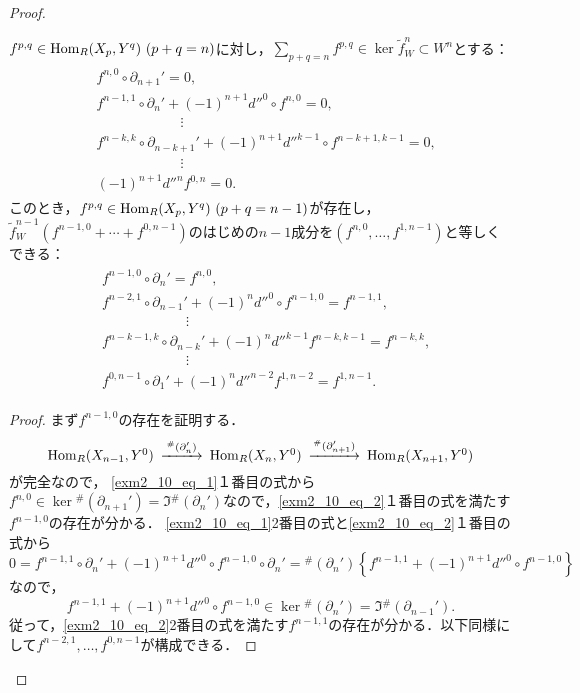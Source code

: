 \begin{proof}
  \begin{lem}\label{lem1.1}
    $f^{p, q} \in \operatorname{Hom}_R(X_p, Y^q)~(p+q=n)$に対し，$\sum_{p+q=n} f^{p, q} \in \ker \tilde{f}_W^n \subset W^n$とする：
    \begin{align}
      \begin{split}
        & f^{n, 0} \circ \partial_{n+1}' = 0, \\
        & f^{n-1, 1} \circ \partial_n' + (-1)^{n+1} d''^0 \circ f^{n, 0} = 0, \\
        & \qquad\qquad\qquad \vdots \\
        & f^{{n-k}, k} \circ \partial_{n-k+1}' + (-1)^{n+1} d''^{k-1} \circ f^{n-k+1, k-1} = 0, \\
        & \qquad\qquad\qquad \vdots \\
        & (-1)^{n+1} d''^n f^{0, n} = 0.
      \end{split}
      \label{exm2_10_eq_1}
    \end{align}
    このとき，$f^{p, q} \in \operatorname{Hom}_R(X_p, Y^q)~(p+q=n-1)$が存在し，$\tilde{f}_W^{n-1}(f^{n-1, 0} + \cdots + f^{0, n-1})$のはじめの$n-1$成分を$(f^{n, 0}, \ldots, f^{1, n-1})$と等しくできる：
    \begin{align}
      \begin{split}
        & f^{n-1, 0} \circ \partial_{n}' = f^{n, 0}, \\
        & f^{n-2, 1} \circ \partial_{n-1}' + (-1)^{n}d''^0 \circ f^{n-1, 0} = f^{n-1, 1}, \\
        & \qquad\qquad\qquad \vdots \\
        & f^{n-k-1, k} \circ \partial_{n-k}' + (-1)^{n} d''^{k-1} f^{n-k, k-1} = f^{n-k, k}, \\
        & \qquad\qquad\qquad \vdots \\
        & f^{0, n-1} \circ \partial_1' + (-1)^{n} d''^{n-2} f^{1, n-2} = f^{1, n-1} .
      \end{split}
      \label{exm2_10_eq_2}
    \end{align}
  \end{lem}
  \begin{proof}
    まず$f^{n-1, 0}$の存在を証明する．
    \[
    \begin{CD}
      \Hom_R(X_{n-1}, Y^0) @>{^\#(\partial_n')}>> \Hom_R(X_n, Y^0) @>{^\#(\partial_{n+1}')}>> \Hom_R(X_{n+1}, Y^0)
    \end{CD}
    \]
    が完全なので，
    \eqref{exm2_10_eq_1}１番目の式から$f^{n, 0} \in \ker {}^\#(\partial_{n+1}') = \Im {}^\#(\partial_n')$なので，\eqref{exm2_10_eq_2}１番目の式を満たす$f^{n-1, 0}$の存在が分かる．
    \eqref{exm2_10_eq_1}2番目の式と\eqref{exm2_10_eq_2}１番目の式から
    \[ 0 = f^{n-1, 1} \circ \partial_n' + (-1)^{n+1} d''^0 \circ f^{n-1, 0} \circ \partial_{n}' = {}^\#(\partial_n') \left\{ f^{n-1, 1} + (-1)^{n+1} d''^0 \circ f^{n-1, 0} \right\} \]
    なので，
    \[ f^{n-1, 1} + (-1)^{n+1} d''^0 \circ f^{n-1, 0} \in \ker {}^\#(\partial_n') = \Im {}^\#(\partial_{n-1}').  \]
    従って，\eqref{exm2_10_eq_2}2番目の式を満たす$f^{n-1, 1}$の存在が分かる．以下同様にして$f^{n-2, 1}, \ldots, f^{0, n-1}$が構成できる．
  \end{proof}


\end{proof}
